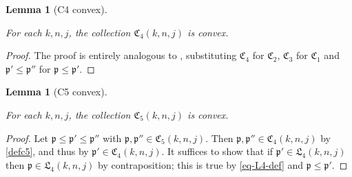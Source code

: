 \documentclass[10pt,a4paper]{article}
\theoremstyle{plain}
\newtheorem{lemma}[theorem]{Lemma}
\theoremstyle{definition}
\numberwithin{equation}{subsection}
\newcommand{\fp}{{\mathfrak p}}
\newcommand{\fL}{{\mathfrak L}}
\newcommand{\fC}{{\mathfrak C}}
\newcommand{\lean}[1]{}
\newcommand{\uses}[1]{}
\newcommand{\leanok}{}
\begin{document}
\begin{lemma}[C4 convex]
    \label{C4-convex}
    \leanok
    \lean{ordConnected_C4}
    \uses{C3-convex}
    For each $k,n,j$, the collection $\fC_4(k,n,j)$ is convex.
\end{lemma}

\begin{proof}
    \leanok
    The proof is entirely analogous to , substituting $\fC_4$ for $\fC_2$,
    $\fC_3$ for $\fC_1$ and $\fp'\le\fp''$ for $\fp\le\fp'$.
\end{proof}

\begin{lemma}[C5 convex]
    \label{C5-convex}
    \leanok
    \lean{ordConnected_C5}
    \uses{C4-convex}
    For each $k,n,j$, the collection $\fC_5(k,n,j)$ is convex.
\end{lemma}

\begin{proof}
    \leanok
    Let $\fp \le \fp' \le\fp''$ with $\fp, \fp'' \in \fC_5(k,n,j)$.
    Then $\fp, \fp'' \in \fC_4(k,n,j)$ by \eqref{defc5}, and thus by  $\fp' \in \fC_4(k,n,j)$.
    It suffices to show that if $\fp' \in \fL_4(k,n,j)$ then $\fp \in \fL_4(k,n,j)$ by contraposition;
    this is true by \eqref{eq-L4-def} and $\fp\le\fp'$.
\end{proof}
\end{document}
